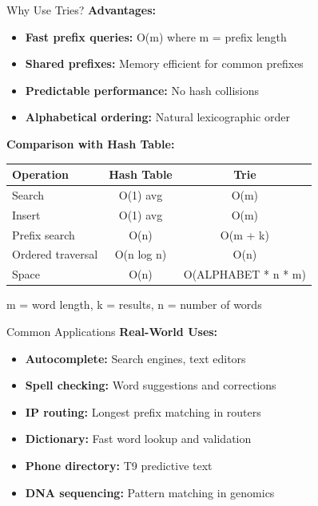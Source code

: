 \documentclass[aspectratio=169]{beamer}
\begin{document}
\begin{frame}{Why Use Tries?}
  \textbf{Advantages:}
  \begin{itemize}
    \item \textbf{Fast prefix queries:} O(m) where m = prefix length
    \item \textbf{Shared prefixes:} Memory efficient for common prefixes
    \item \textbf{Predictable performance:} No hash collisions
    \item \textbf{Alphabetical ordering:} Natural lexicographic order
  \end{itemize}

  \vspace{0.3cm}
  \textbf{Comparison with Hash Table:}
  \begin{table}
    \centering
    \small
    \begin{tabular}{|l|c|c|}
      \hline
      \textbf{Operation} & \textbf{Hash Table} & \textbf{Trie} \\
      \hline
      Search & O(1) avg & O(m) \\
      \hline
      Insert & O(1) avg & O(m) \\
      \hline
      Prefix search & O(n) & O(m + k) \\
      \hline
      Ordered traversal & O(n log n) & O(n) \\
      \hline
      Space & O(n) & O(ALPHABET * n * m) \\
      \hline
    \end{tabular}
  \end{table}

  \vspace{0.2cm}
  \small m = word length, k = results, n = number of words
\end{frame}

\begin{frame}{Common Applications}
  \textbf{Real-World Uses:}
  \begin{itemize}
    \item \textbf{Autocomplete:} Search engines, text editors
    \item \textbf{Spell checking:} Word suggestions and corrections
    \item \textbf{IP routing:} Longest prefix matching in routers
    \item \textbf{Dictionary:} Fast word lookup and validation
    \item \textbf{Phone directory:} T9 predictive text
    \item \textbf{DNA sequencing:} Pattern matching in genomics
  \end{itemize}
\end{frame}
\end{document}
